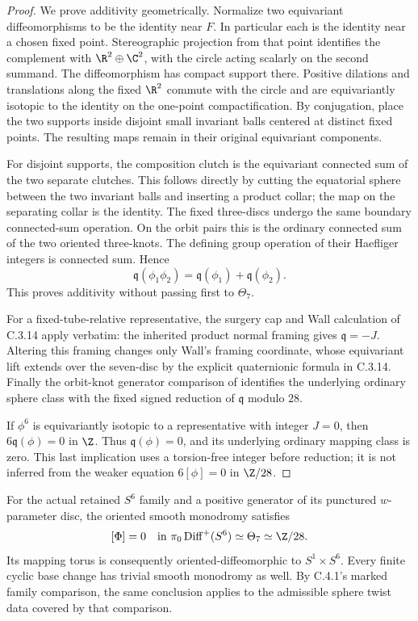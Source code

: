 \begin{proof}
We prove additivity geometrically. Normalize two equivariant
diffeomorphisms to be the identity near $F$. In particular each
is the identity near a chosen fixed point. Stereographic
projection from that point identifies the complement with
$\R^2\oplus\C^2$, with the circle acting scalarly on the
second summand. The diffeomorphism has compact support there.
Positive dilations and translations along the fixed $\R^2$
commute with the circle and are equivariantly isotopic to the
identity on the one-point compactification. By conjugation,
place the two supports inside disjoint small invariant balls
centered at distinct fixed points. The resulting maps remain
in their original equivariant components.

For disjoint supports, the composition clutch is the
equivariant connected sum of the two separate clutches.
This follows directly by cutting the equatorial sphere between
the two invariant balls and inserting a product collar; the
map on the separating collar is the identity. The fixed
three-discs undergo the same boundary connected-sum operation.
On the orbit pairs this is the ordinary connected sum of
the two oriented three-knots. The defining group operation
of their Haefliger integers is connected sum. Hence
\[
 \mathfrak q(\phi_1\phi_2)
 =\mathfrak q(\phi_1)+\mathfrak q(\phi_2).
\]
This proves additivity without passing first to $\Theta_7$.

For a fixed-tube-relative representative, the surgery cap and
Wall calculation of C.3.14 apply verbatim: the inherited product
normal framing gives $\mathfrak q=-J$. Altering this framing
changes only Wall's framing coordinate, whose equivariant lift
extends over the seven-disc by the explicit quaternionic
formula in C.3.14. Finally the orbit-knot generator comparison
of \citet[Example 7.14 and Proposition 7.15]{Davis1982D}
identifies the underlying ordinary sphere class with the fixed
signed reduction of $\mathfrak q$ modulo $28$.

If $\phi^6$ is equivariantly isotopic to a representative with
integer $J=0$, then $6\mathfrak q(\phi)=0$ in $\Z$.
Thus $\mathfrak q(\phi)=0$, and its underlying ordinary
mapping class is zero. This last implication uses a torsion-free
integer before reduction; it is not inferred from the weaker
equation $6[\phi]=0$ in $\Z/28$.
\end{proof}
\begin{theorem}
For the actual retained $S^6$ family and a positive generator
of its punctured $w$-parameter disc, the oriented smooth
monodromy satisfies
\[
 [\Phi]=0\quad\hbox{in }\pi_0\operatorname{Diff}^+(S^6)
                       \simeq\Theta_7\simeq\Z/28.
\]
Its mapping torus is consequently oriented-diffeomorphic to
$S^1\times S^6$. Every finite cyclic base change has trivial
smooth monodromy as well. By C.4.1's marked family comparison,
the same conclusion applies to the admissible sphere twist
data covered by that comparison.
\end{theorem}
